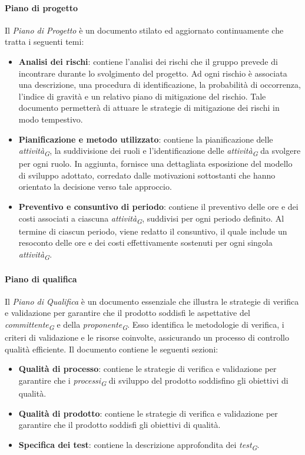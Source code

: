 \paragraph{Piano di progetto}
Il \textit{Piano di Progetto} è un documento stilato ed aggiornato continuamente che tratta i seguenti temi: 
\begin{itemize}
    \item \textbf{Analisi dei rischi}: contiene l'analisi dei rischi che il gruppo prevede di incontrare durante lo svolgimento del progetto. Ad ogni rischio è associata una descrizione, una procedura di identificazione, la probabilità di occorrenza, l'indice di gravità e un relativo piano di mitigazione del rischio. Tale documento permetterà di attuare le strategie di mitigazione dei rischi in modo tempestivo.
    \item \textbf{Pianificazione e metodo utilizzato}: contiene la pianificazione delle \textit{attività}\textsubscript{\textit{G}}, la suddivisione dei ruoli e l'identificazione delle \textit{attività}\textsubscript{\textit{G}} da svolgere per ogni ruolo. In aggiunta, fornisce una dettagliata esposizione del modello di sviluppo adottato, corredato dalle motivazioni sottostanti che hanno orientato la decisione verso tale approccio.
    \item \textbf{Preventivo e consuntivo di periodo}: contiene il preventivo  delle ore e dei costi associati a ciascuna \textit{attività}\textsubscript{\textit{G}}, suddivisi per ogni periodo definito. Al termine di ciascun periodo, viene redatto il consuntivo, il quale include un resoconto delle ore e dei costi effettivamente sostenuti per ogni singola \textit{attività}\textsubscript{\textit{G}}.
\end{itemize}

\paragraph{Piano di qualifica}
Il \textit{Piano di Qualifica} è un documento essenziale che illustra le strategie di verifica e validazione per garantire che il prodotto soddisfi le aspettative del \textit{committente}\textsubscript{\textit{G}} e della \textit{proponente}\textsubscript{\textit{G}}. Esso identifica le metodologie di verifica, i criteri di validazione e le risorse coinvolte, assicurando un processo di controllo qualità efficiente.  
Il documento contiene le seguenti sezioni:  
\begin{itemize}
    \item \textbf{Qualità di processo}: contiene le strategie di verifica e validazione per garantire che i \textit{processi}\textsubscript{\textit{G}} di sviluppo del prodotto soddisfino gli obiettivi di qualità.
    \item \textbf{Qualità di prodotto}: contiene le strategie di verifica e validazione per garantire che il prodotto soddisfi gli obiettivi di qualità.
    \item \textbf{Specifica dei test}: contiene la descrizione approfondita dei \textit{test}\textsubscript{\textit{G}}. 
\end{itemize}


